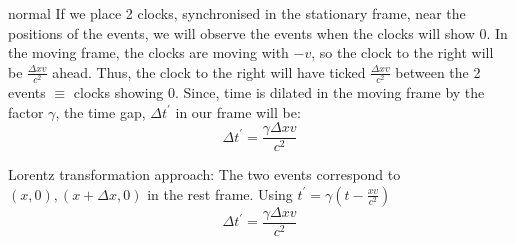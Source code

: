 \begin{solution}{normal}
If we place 2 clocks, synchronised in the stationary frame, near the positions of the events, we will observe the events when the clocks will show $0$.
In the moving frame, the clocks are moving with $-v$, so the clock to the right will be $\frac{\Delta x v}{c^2}$ ahead.
Thus, the clock to the right will have ticked $\frac{\Delta x v}{c^2}$ between the 2 events $\equiv$ clocks showing $0$.
Since, time is dilated in the moving frame by the factor $\gamma$, the time gap, $\Delta t^{'}$ in our frame will be:
$$\Delta t^{'}=\frac{\gamma \Delta x v}{c^2}$$

Lorentz transformation approach:
The two events correspond to $(x,0),(x+\Delta x,0)$ in the rest frame.
Using $t^{'}=\gamma(t-\frac{xv}{c^2})$
$$\Delta t^{'}=\frac{\gamma \Delta x v}{c^2}$$
\end{solution}